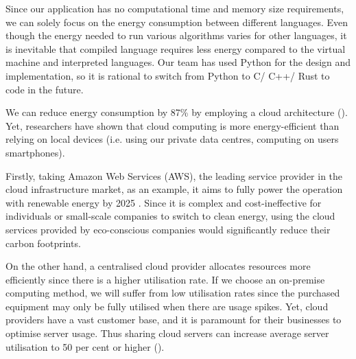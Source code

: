 Since our application has no computational time and memory size requirements, we can solely focus on the energy consumption between 
different languages. Even though the energy needed to run various algorithms varies for other languages, it is inevitable that
compiled language requires less energy compared to the virtual machine and interpreted languages. Our team has used Python for the design and implementation, so 
it is rational to switch from Python to C/ C++/ Rust to code in the future.

We can reduce energy consumption by 87\% by employing a cloud architecture (\cite{cloudpercent}).
Yet, researchers have shown that cloud computing is more energy-efficient than relying on local devices (i.e. using our private data centres, computing on
users\textsc{} smartphones).

Firstly, taking Amazon Web Services (AWS), the leading service provider in the cloud infrastructure market, as an example, it aims to fully power the operation with renewable
energy by 2025 . Since it is complex and cost-ineffective for individuals or small-scale companies to switch to clean energy, using the cloud services provided
by eco-conscious companies would significantly reduce their carbon footprints.

On the other hand, a centralised cloud provider allocates resources more efficiently since there is a higher utilisation rate. If we choose an on-premise computing method, we will suffer
from low utilisation rates since the purchased equipment may only be fully utilised when there are usage spikes. Yet, cloud providers have a vast customer base, and it is paramount for 
their businesses to optimise server usage. Thus sharing cloud servers can increase average server utilisation to 50 per cent or higher (\cite{cloud}).

